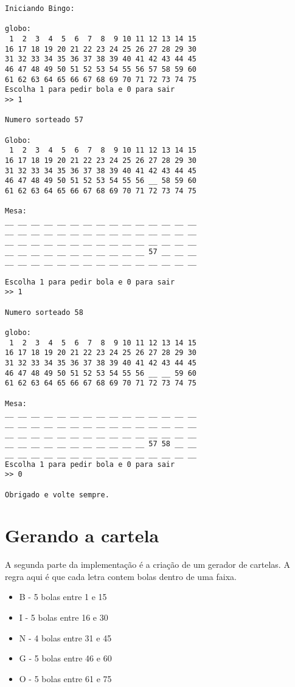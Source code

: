 \documentclass[12pt]{article}
\begin{document}
\begin{verbatim}
Iniciando Bingo:

globo:
 1  2  3  4  5  6  7  8  9 10 11 12 13 14 15 
16 17 18 19 20 21 22 23 24 25 26 27 28 29 30 
31 32 33 34 35 36 37 38 39 40 41 42 43 44 45 
46 47 48 49 50 51 52 53 54 55 56 57 58 59 60 
61 62 63 64 65 66 67 68 69 70 71 72 73 74 75 
Escolha 1 para pedir bola e 0 para sair
>> 1

Numero sorteado 57

Globo:
 1  2  3  4  5  6  7  8  9 10 11 12 13 14 15 
16 17 18 19 20 21 22 23 24 25 26 27 28 29 30 
31 32 33 34 35 36 37 38 39 40 41 42 43 44 45 
46 47 48 49 50 51 52 53 54 55 56 __ 58 59 60 
61 62 63 64 65 66 67 68 69 70 71 72 73 74 75 

Mesa:
__ __ __ __ __ __ __ __ __ __ __ __ __ __ __ 
__ __ __ __ __ __ __ __ __ __ __ __ __ __ __ 
__ __ __ __ __ __ __ __ __ __ __ __ __ __ __ 
__ __ __ __ __ __ __ __ __ __ __ 57 __ __ __ 
__ __ __ __ __ __ __ __ __ __ __ __ __ __ __ 

Escolha 1 para pedir bola e 0 para sair
>> 1

Numero sorteado 58

globo:
 1  2  3  4  5  6  7  8  9 10 11 12 13 14 15 
16 17 18 19 20 21 22 23 24 25 26 27 28 29 30 
31 32 33 34 35 36 37 38 39 40 41 42 43 44 45 
46 47 48 49 50 51 52 53 54 55 56 __ __ 59 60 
61 62 63 64 65 66 67 68 69 70 71 72 73 74 75 

Mesa:
__ __ __ __ __ __ __ __ __ __ __ __ __ __ __ 
__ __ __ __ __ __ __ __ __ __ __ __ __ __ __ 
__ __ __ __ __ __ __ __ __ __ __ __ __ __ __ 
__ __ __ __ __ __ __ __ __ __ __ 57 58 __ __ 
__ __ __ __ __ __ __ __ __ __ __ __ __ __ __ 
Escolha 1 para pedir bola e 0 para sair
>> 0

Obrigado e volte sempre.
\end{verbatim}


\section{Gerando a cartela}
A segunda parte da implementação é a criação de um gerador de cartelas.
A regra aqui é que cada letra contem bolas dentro de uma faixa.
\begin{itemize}
\item B - 5 bolas entre 1 e 15
\item I - 5 bolas entre 16 e 30
\item N - 4 bolas entre 31 e 45
\item G - 5 bolas entre 46 e 60
\item O - 5 bolas entre 61 e 75
\end{itemize}
\end{document}
